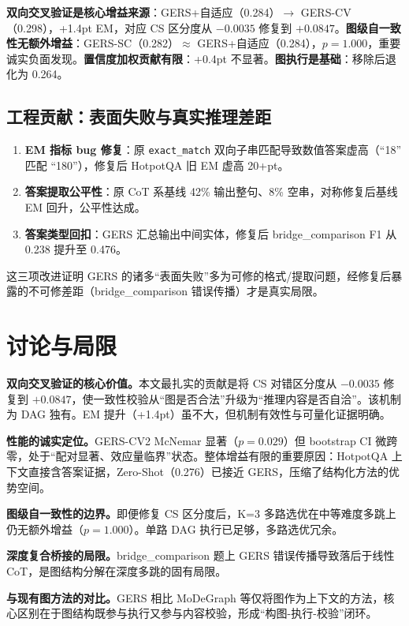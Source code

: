 \documentclass[11pt,a4paper]{ctexart}
\begin{document}
\textbf{双向交叉验证是核心增益来源}：GERS+自适应（0.284）$\to$ GERS-CV（0.298），+1.4pt EM，对应 CS 区分度从 $-0.0035$ 修复到 $+0.0847$。\textbf{图级自一致性无额外增益}：GERS-SC（0.282）$\approx$ GERS+自适应（0.284），$p=1.000$，重要诚实负面发现。\textbf{置信度加权贡献有限}：+0.4pt 不显著。\textbf{图执行是基础}：移除后退化为 0.264。

\subsection{工程贡献：表面失败与真实推理差距}

\begin{enumerate}[label=\arabic*.]
\item \textbf{EM 指标 bug 修复}：原 \texttt{exact\_match} 双向子串匹配导致数值答案虚高（``18'' 匹配 ``180''），修复后 HotpotQA 旧 EM 虚高 20+pt。
\item \textbf{答案提取公平性}：原 CoT 系基线 42\% 输出整句、8\% 空串，对称修复后基线 EM 回升，公平性达成。
\item \textbf{答案类型回扣}：GERS 汇总输出中间实体，修复后 bridge\_comparison F1 从 0.238 提升至 0.476。
\end{enumerate}
这三项改进证明 GERS 的诸多``表面失败''多为可修的格式/提取问题，经修复后暴露的不可修差距（bridge\_comparison 错误传播）才是真实局限。

\section{讨论与局限}

\textbf{双向交叉验证的核心价值。}本文最扎实的贡献是将 CS 对错区分度从 $-0.0035$ 修复到 $+0.0847$，使一致性校验从``图是否合法''升级为``推理内容是否自洽''。该机制为 DAG 独有。EM 提升（+1.4pt）虽不大，但机制有效性与可量化证据明确。

\textbf{性能的诚实定位。}GERS-CV2 McNemar 显著（$p=0.029$）但 bootstrap CI 微跨零，处于``配对显著、效应量临界''状态。整体增益有限的重要原因：HotpotQA 上下文直接含答案证据，Zero-Shot（0.276）已接近 GERS，压缩了结构化方法的优势空间。

\textbf{图级自一致性的边界。}即便修复 CS 区分度后，K=3 多路选优在中等难度多跳上仍无额外增益（$p=1.000$）。单路 DAG 执行已足够，多路选优冗余。

\textbf{深度复合桥接的局限。}bridge\_comparison 题上 GERS 错误传播导致落后于线性 CoT，是图结构分解在深度多跳的固有局限。

\textbf{与现有图方法的对比。}GERS 相比 MoDeGraph 等仅将图作为上下文的方法，核心区别在于图结构既参与执行又参与内容校验，形成``构图-执行-校验''闭环。
\end{document}
